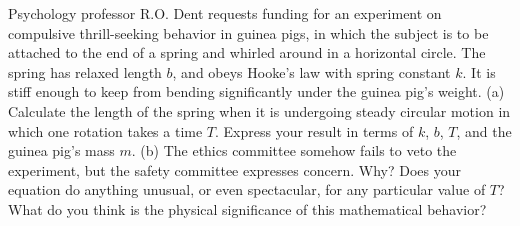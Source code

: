  Psychology professor R.O. Dent requests funding for an
experiment on compulsive thrill-seeking behavior in
guinea pigs, in which the subject is to be attached to the end
of a spring and whirled around in a horizontal circle. The
spring has relaxed length $b$, and obeys Hooke's law
with spring constant $k$. It is stiff enough to keep from
bending significantly under the guinea pig's weight.\hwendpart
(a) Calculate the length of the spring when it is
undergoing steady circular motion in which one rotation
takes a time $T$. Express your result in terms of $k$, $b$, $T$, and the
guinea pig's mass $m$.\answercheck\hwendpart
(b) The ethics committee somehow fails to veto the
experiment, but the safety committee expresses concern. Why?
Does your equation do anything unusual, or even spectacular,
for any particular value of $T$?  What do you think is the
physical significance of this mathematical behavior?
